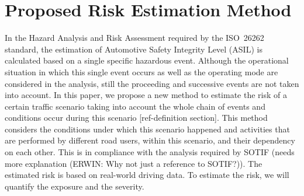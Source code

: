 \section{Proposed Risk Estimation Method} %
\label{sec:method}

%	
%	 
%
 
In the Hazard Analysis and Risk Assessment required by the ISO~26262 standard, the estimation of Automotive Safety Integrity Level (ASIL) is calculated based on a single specific hazardous event.
Although the operational situation in which this single event occurs as well as the operating mode are considered in the analysis, still the proceeding and successive events are not taken into account.
In this paper, we propose a new method to estimate the risk of a certain traffic scenario taking into account the whole chain of events and conditions occur during this scenario [ref-definition section].
 This method considers the conditions under which this scenario happened and activities that are performed by different road users, within this scenario, and their dependency on each other. This is in compliance with the analysis required by SOTIF (needs more explanation (ERWIN: Why not just a reference to SOTIF?)).  The estimated risk is based on real-world driving data. To estimate the risk, we will quantify the exposure and the severity.

